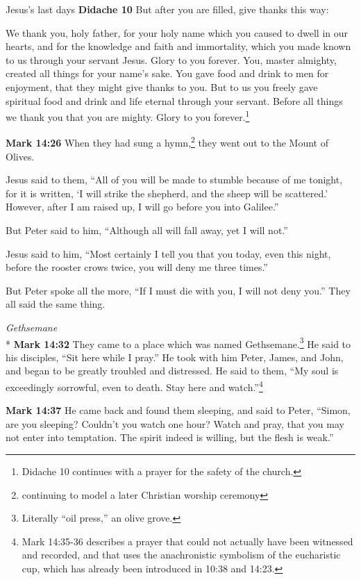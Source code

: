 \documentclass[10pt,twoside]{article} %
\newcommand{\quotesize}{\normalsize{}}
\newenvironment{quotetext}{\begingroup\quotesize}{\endgroup}
\newcommand{\intex}[1]{\index[texts]{#1}}
\newcommand{\reftex}[1]{#1\intex{#1}}
\newcommand{\bible}[2]{\begin{quotetext}\textbf{#1}\intex{#1} #2\end{quotetext}}
\newcommand{\gospelmark}[2]{\bible{Mark #1}{#2}}
\newcommand{\subhead}[1]{\emph{#1}\\*}
\begin{document}
\begin{section}{Jesus's last days}
\bible{Didache 10}{
But after you are filled, give thanks this way:

We thank you, holy father, for your holy name which you caused to
dwell in our hearts, and for the knowledge and faith and
immortality, which you made known to us through your servant Jesus.
Glory to you forever. You, master almighty, created all
things for your name's sake. You gave food and drink to men for
enjoyment, that they might give thanks to you. But to us you
freely gave spiritual food and drink and life eternal through your
servant. Before all things we thank you that you are mighty.
Glory to you forever.\footnote{Didache 10 continues with a prayer for the safety of the church.}
}

\gospelmark{14:26}{
When they had sung a hymn,\footnote{continuing to model a later Christian worship ceremony} they went out to the Mount of Olives.

  Jesus said to them, ``All of you will be made to stumble because of me tonight, for it is written, `I will strike the shepherd, and the sheep will be scattered.'    However, after I am raised up, I will go before you into Galilee.''

  But Peter said to him, ``Although all will fall away, yet I will not.''

  Jesus said to him, ``Most certainly I tell you that you today, even this night, before the rooster crows twice, you will deny me three times.''

  But Peter spoke all the more, ``If I must die with you, I will not deny you.'' They all said the same thing.
}

\subhead{Gethsemane}
\gospelmark{14:32}{
  They came to a place which was named Gethsemane.\footnote{Literally ``oil press,'' an olive grove.}
He said to his disciples, ``Sit here while I pray.''   He took with him Peter, James, and John, and began to be greatly troubled and distressed.   He said to them, ``My soul is exceedingly sorrowful, even to death. Stay here and watch.''\footnote{\reftex{Mark 14:35-36} describes a prayer that could
not actually have been witnessed and recorded, and that uses the anachronistic symbolism of the
eucharistic cup, which has already been introduced in 10:38 and 14:23.}
}

\gospelmark{14:37}{
  He came back and found them sleeping, and said to Peter, ``Simon, are you sleeping? Couldn't you watch one hour?    Watch and pray, that you may not enter into temptation. The spirit indeed is willing, but the flesh is weak.''

}
\end{section}
\end{document}

